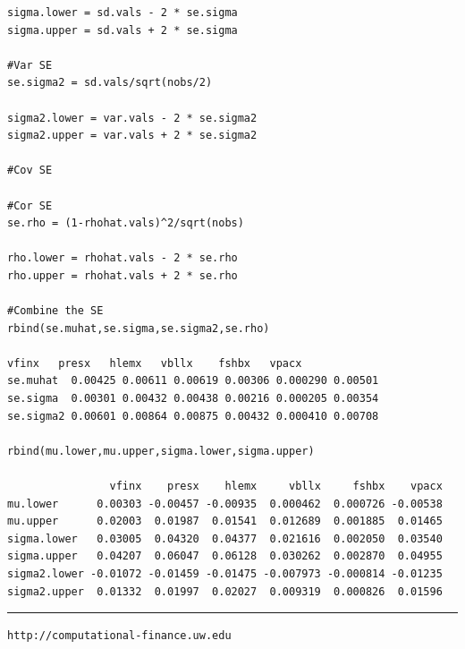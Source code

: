 \documentclass[letterpaper,12pt]{article}
\begin{document}
\begin{enumerate}
\begin{lstlisting}
sigma.lower = sd.vals - 2 * se.sigma
sigma.upper = sd.vals + 2 * se.sigma

#Var SE
se.sigma2 = sd.vals/sqrt(nobs/2)

sigma2.lower = var.vals - 2 * se.sigma2
sigma2.upper = var.vals + 2 * se.sigma2

#Cov SE

#Cor SE
se.rho = (1-rhohat.vals)^2/sqrt(nobs)

rho.lower = rhohat.vals - 2 * se.rho
rho.upper = rhohat.vals + 2 * se.rho

#Combine the SE
rbind(se.muhat,se.sigma,se.sigma2,se.rho)

vfinx   presx   hlemx   vbllx    fshbx   vpacx
se.muhat  0.00425 0.00611 0.00619 0.00306 0.000290 0.00501
se.sigma  0.00301 0.00432 0.00438 0.00216 0.000205 0.00354
se.sigma2 0.00601 0.00864 0.00875 0.00432 0.000410 0.00708

rbind(mu.lower,mu.upper,sigma.lower,sigma.upper)

                vfinx    presx    hlemx     vbllx     fshbx    vpacx
mu.lower      0.00303 -0.00457 -0.00935  0.000462  0.000726 -0.00538
mu.upper      0.02003  0.01987  0.01541  0.012689  0.001885  0.01465
sigma.lower   0.03005  0.04320  0.04377  0.021616  0.002050  0.03540
sigma.upper   0.04207  0.06047  0.06128  0.030262  0.002870  0.04955
sigma2.lower -0.01072 -0.01459 -0.01475 -0.007973 -0.000814 -0.01235
sigma2.upper  0.01332  0.01997  0.02027  0.009319  0.000826  0.01596

\end{lstlisting}
\end{enumerate}
\vfill \hrule \vspace{2mm} \centerline {\tt \tiny http://computational-finance.uw.edu}
\end{document}
